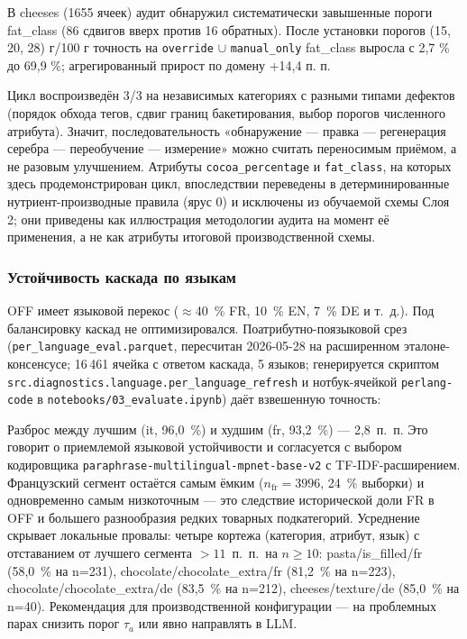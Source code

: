В cheeses (1655 ячеек) аудит обнаружил систематически завышенные пороги fat\_class (86 сдвигов вверх против 16 обратных). После установки порогов (15, 20, 28) г/100 г точность на \texttt{override} $\cup$ \texttt{manual\_only} fat\_class выросла с 2,7 \% до 69,9 \%; агрегированный прирост по домену +14,4 п. п.

Цикл воспроизведён 3/3 на независимых категориях с разными типами дефектов (порядок обхода тегов, сдвиг границ бакетирования, выбор порогов численного атрибута). Значит, последовательность «обнаружение — правка — регенерация серебра — переобучение — измерение» можно считать переносимым приёмом, а не разовым улучшением. Атрибуты \texttt{cocoa\_percentage} и \texttt{fat\_class}, на которых здесь продемонстрирован цикл, впоследствии переведены в детерминированные нутриент-производные правила (ярус 0) и исключены из обучаемой схемы Слоя 2; они приведены как иллюстрация методологии аудита на момент её применения, а не как атрибуты итоговой производственной схемы.

\subsubsection{Устойчивость каскада по языкам}
\label{subsec:per_language}

OFF имеет языковой перекос ($\approx$40~\% FR, 10~\% EN, 7~\% DE и т.~д.). Под балансировку каскад не оптимизировался. Поатрибутно-поязыковой срез (\texttt{per\_language\_eval.parquet}, пересчитан 2026-05-28 на расширенном эталоне-консенсусе; 16\,461 ячейка с ответом каскада, 5 языков; генерируется скриптом \texttt{src.diagnostics.language.per\_language\_refresh} и нотбук-ячейкой \texttt{perlang-code} в \texttt{notebooks/03\_evaluate.ipynb}) даёт взвешенную точность:



Разброс между лучшим (it, 96,0~\%) и худшим (fr, 93,2~\%) --- 2,8~п.~п. Это говорит о приемлемой языковой устойчивости и согласуется с выбором кодировщика \texttt{paraphrase-\allowbreak multilingual-\allowbreak mpnet-\allowbreak base-v2} с TF-IDF-расширением. Французский сегмент остаётся самым ёмким ($n_{\text{fr}}=3996$, 24~\% выборки) и одновременно самым низкоточным --- это следствие исторической доли FR в OFF и большего разнообразия редких товарных подкатегорий. Усреднение скрывает локальные провалы: четыре кортежа (категория, атрибут, язык) с отставанием от лучшего сегмента $> 11$~п.~п.\ на $n \ge 10$: pasta/is\_filled/fr (58,0~\% на n=231), chocolate/chocolate\_extra/fr (81,2~\% на n=223), chocolate/chocolate\_extra/de (83,5~\% на n=212), cheeses/texture/de (85,0~\% на n=40). Рекомендация для производственной конфигурации --- на проблемных парах снизить порог $\tau_a$ или явно направлять в LLM.

